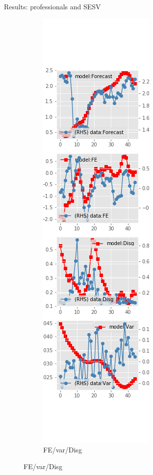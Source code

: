 \documentclass{beamer}
\begin{document}
\begin{frame}{Results: professionals and SESV}
\begin{figure}[ht]
\begin{subfigure}[b]{0.19\textwidth}
		\end{subfigure}
		\hfill
		\begin{subfigure}[b]{0.19\textwidth}
			\caption{FE/var/Disg}
			\includegraphics[width=\textwidth, height = 0.8\textheight]{figuresDraft/spf_se_est_sv_diag4.png}
		\end{subfigure}
	\end{figure}
\end{frame}
\end{document}
